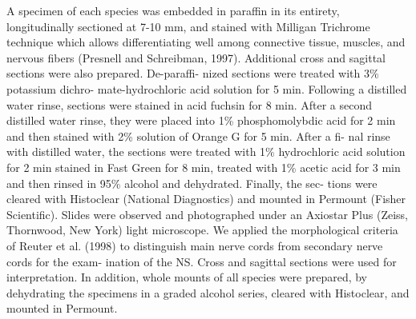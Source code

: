 \begin{multicols}{2}
\par{}A specimen of each species was embedded in paraffin
in its entirety, longitudinally sectioned at 7-10 mm, and
stained with Milligan Trichrome technique which allows
differentiating well among connective tissue, muscles, and
nervous fibers (Presnell and Schreibman, 1997). Additional
cross and sagittal sections were also prepared. De-paraffi-
nized sections were treated with 3\% potassium dichro-
mate-hydrochloric acid solution for 5 min. Following a
distilled water rinse, sections were stained in acid fuchsin
for 8 min. After a second distilled water rinse, they were
placed into 1\% phosphomolybdic acid for 2 min and then
stained with 2\% solution of Orange G for 5 min. After a fi-
nal rinse with distilled water, the sections were treated with
1\% hydrochloric acid solution for 2 min stained in Fast
Green for 8 min, treated with 1\% acetic acid for 3 min and
then rinsed in 95\% alcohol and dehydrated. Finally, the sec-
tions were cleared with Histoclear (National Diagnostics)
and mounted in Permount (Fisher Scientific). Slides were
observed and photographed under an Axiostar Plus (Zeiss,
Thornwood, New York) light microscope. We applied the
morphological criteria of Reuter et al. (1998) to distinguish
main nerve cords from secondary nerve cords for the exam-
ination of the NS. Cross and sagittal sections were used for
interpretation. In addition, whole mounts of all species
were prepared, by dehydrating the specimens in a graded
alcohol series, cleared with Histoclear, and mounted in
Permount.

\lipsum



\lipsum


\lipsum
\lipsum


\lipsum
\lipsum


\end{multicols}
